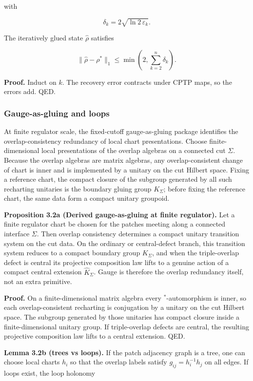 with

\[
\delta_k = 2 \sqrt{\ln 2\, \varepsilon_k}.
\]

The iteratively glued state \(\hat{\rho}\) satisfies

\[
\| \hat{\rho} - \rho^{\ast} \|_1 \le \min\left(2, \sum_{k=2}^n \delta_k\right).
\]

\textbf{Proof.} Induct on \(k\). The recovery error contracts under CPTP maps, so the errors add. QED.

\subsubsection{Gauge-as-gluing and loops}\label{32-gauge-as-gluing-and-loops}

At finite regulator scale, the fixed-cutoff gauge-as-gluing package identifies the overlap-consistency redundancy of local chart presentations. Choose finite-dimensional local presentations of the overlap algebras on a connected cut \(\Sigma\). Because the overlap algebras are matrix algebras, any overlap-consistent change of chart is inner and is implemented by a unitary on the cut Hilbert space. Fixing a reference chart, the compact closure of the subgroup generated by all such recharting unitaries is the boundary gluing group \(K_\Sigma\); before fixing the reference chart, the same data form a compact unitary groupoid.

\textbf{Proposition 3.2a (Derived gauge-as-gluing at finite regulator).} Let a finite regulator chart be chosen for the patches meeting along a connected interface \(\Sigma\). Then overlap consistency determines a compact unitary transition system on the cut data. On the ordinary or central-defect branch, this transition system reduces to a compact boundary group \(K_\Sigma\), and when the triple-overlap defect is central its projective composition law lifts to a genuine action of a compact central extension \(\widehat K_\Sigma\). Gauge is therefore the overlap redundancy itself, not an extra primitive.

\textbf{Proof.} On a finite-dimensional matrix algebra every \(^*\)-automorphism is inner, so each overlap-consistent recharting is conjugation by a unitary on the cut Hilbert space. The subgroup generated by those unitaries has compact closure inside a finite-dimensional unitary group. If triple-overlap defects are central, the resulting projective composition law lifts to a central extension. QED.

\textbf{Lemma 3.2b (trees vs loops).} If the patch adjacency graph is a tree, one can choose local charts \(h_i\) so that the overlap labels satisfy \(g_{ij} = h_i^{-1} h_j\) on all edges. If loops exist, the loop holonomy

